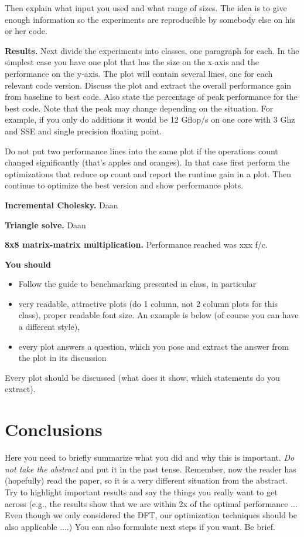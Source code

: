 \documentclass[letterpaper]{article}
\newcommand{\mypar}[1]{{\bf #1.}}
\begin{document}
Then explain what input you used and what range of sizes. The idea is to give enough information so the experiments are reproducible by somebody else on his or her code.

\mypar{Results}
Next divide the experiments into classes, one paragraph for each. In the simplest case you have one plot that has the size on the x-axis and the performance on the y-axis. The plot will contain several lines, one for each relevant code version. Discuss the plot and extract the overall performance gain from baseline to best code. Also state the percentage of peak performance for the best code. Note that the peak may change depending on the situation. For example, if you only do additions it would be 12 Gflop/s
on one core with 3 Ghz and SSE and single precision floating point.

Do not put two performance lines into the same plot if the operations count changed significantly (that's apples and oranges). In that case first perform the optimizations that reduce op count and report the runtime gain in a plot. Then continue to optimize the best version and show performance plots.

\mypar{Incremental Cholesky} Daan

\mypar{Triangle solve} Daan

\mypar{8x8 matrix-matrix multiplication} Performance reached was xxx f/c.

{\bf You should}
\begin{itemize}
\item Follow the guide to benchmarking presented in class, in particular
\item very readable, attractive plots (do 1 column, not 2 column plots
for this class), proper readable font size. An example is below (of course you can have a different style),
\item every plot answers a question, which you pose and extract the
answer from the plot in its discussion
\end{itemize}
Every plot should be discussed (what does it show, which statements do
you extract).

\section{Conclusions}

Here you need to briefly summarize what you did and why this is
important. {\em Do not take the abstract} and put it in the past
tense. Remember, now the reader has (hopefully) read the paper, so it
is a very different situation from the abstract. Try to highlight
important results and say the things you really want to get across
(e.g., the results show that we are within 2x of the optimal performance ... 
Even though we only considered the DFT, our optimization
techniques should be also applicable ....) You can also formulate next
steps if you want. Be brief.
\end{document}
